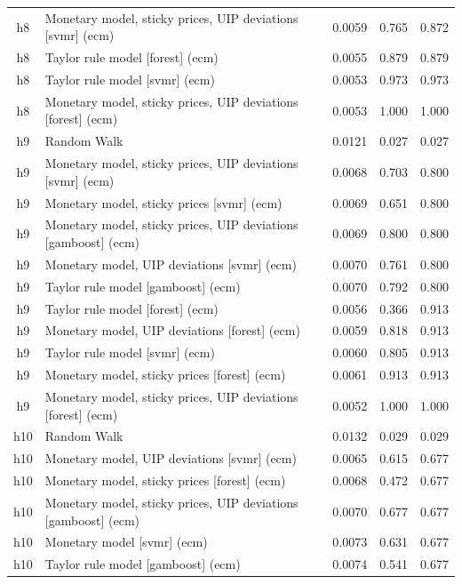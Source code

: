 \begin{ThreePartTable}
\begin{longtable}[t]{cp{5.5cm}ccc}
h8 & \raggedright Monetary model, sticky prices, UIP deviations [svmr] (ecm) & 0.0059 & 0.765 & 0.872\\
h8 & \raggedright Taylor rule model [forest] (ecm) & 0.0055 & 0.879 & 0.879\\
h8 & \raggedright Taylor rule model [svmr] (ecm) & 0.0053 & 0.973 & 0.973\\
h8 & \raggedright Monetary model, sticky prices, UIP deviations [forest] (ecm) & 0.0053 & 1.000 & 1.000\\
\addlinespace
h9 & \raggedright Random Walk & 0.0121 & 0.027 & 0.027\\
h9 & \raggedright Monetary model, sticky prices, UIP deviations [svmr] (ecm) & 0.0068 & 0.703 & 0.800\\
h9 & \raggedright Monetary model, sticky prices [svmr] (ecm) & 0.0069 & 0.651 & 0.800\\
h9 & \raggedright Monetary model, sticky prices, UIP deviations [gamboost] (ecm) & 0.0069 & 0.800 & 0.800\\
h9 & \raggedright Monetary model, UIP deviations [svmr] (ecm) & 0.0070 & 0.761 & 0.800\\
h9 & \raggedright Taylor rule model [gamboost] (ecm) & 0.0070 & 0.792 & 0.800\\
h9 & \raggedright Taylor rule model [forest] (ecm) & 0.0056 & 0.366 & 0.913\\
h9 & \raggedright Monetary model, UIP deviations [forest] (ecm) & 0.0059 & 0.818 & 0.913\\
h9 & \raggedright Taylor rule model [svmr] (ecm) & 0.0060 & 0.805 & 0.913\\
h9 & \raggedright Monetary model, sticky prices [forest] (ecm) & 0.0061 & 0.913 & 0.913\\
h9 & \raggedright Monetary model, sticky prices, UIP deviations [forest] (ecm) & 0.0052 & 1.000 & 1.000\\
\addlinespace
h10 & \raggedright Random Walk & 0.0132 & 0.029 & 0.029\\
h10 & \raggedright Monetary model, UIP deviations [svmr] (ecm) & 0.0065 & 0.615 & 0.677\\
h10 & \raggedright Monetary model, sticky prices [forest] (ecm) & 0.0068 & 0.472 & 0.677\\
h10 & \raggedright Monetary model, sticky prices, UIP deviations [gamboost] (ecm) & 0.0070 & 0.677 & 0.677\\
h10 & \raggedright Monetary model [svmr] (ecm) & 0.0073 & 0.631 & 0.677\\
h10 & \raggedright Taylor rule model [gamboost] (ecm) & 0.0074 & 0.541 & 0.677\\

\end{longtable}
\end{ThreePartTable}
